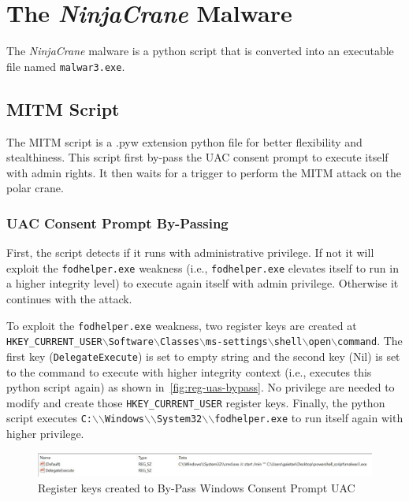 \section{The \emph{NinjaCrane} Malware}

The \emph{NinjaCrane} malware is a python script that is converted into an executable file named \texttt{malwar3.exe}.

\subsection{MITM Script}

The MITM script is a .pyw extension python file for better flexibility and stealthiness. This script first by-pass the UAC consent prompt to execute itself with admin rights. It then waits for a trigger to perform the MITM attack on the polar crane.

\subsubsection{UAC Consent Prompt By-Passing}

First, the script detects if it runs with administrative privilege. If not it will exploit the \texttt{fodhelper.exe} weakness (i.e., \texttt{fodhelper.exe} elevates itself to run in a higher integrity level) to execute again itself with admin privilege. Otherwise it continues with the attack. 

To exploit the \texttt{fodhelper.exe} weakness, two register keys are created at \texttt{HKEY\_CURRENT\_USER$\backslash$Software$\backslash$Classes$\backslash$ms-settings$\backslash$shell$\backslash$open$\backslash$command}. The first key (\texttt{DelegateExecute}) is set to empty string and the second key (Nil) is set to the command to execute with higher integrity context (i.e., executes this python script again) as shown in~\autoref{fig:reg-uas-bypass}. No privilege are needed to modify and create those \texttt{HKEY\_CURRENT\_USER} register keys. Finally, the python script executes \texttt{C:$\backslash$$\backslash$Windows$\backslash$$\backslash$System32$\backslash$$\backslash$fodhelper.exe} to run itself again with higher privilege. 

\begin{figure}[H]
    \centering
    \includegraphics[width=\linewidth]{figures/reg-uac-bypass.jpg}
    \caption{Register keys created to By-Pass Windows Consent Prompt UAC}
    \label{fig:reg-uas-bypass}
\end{figure}


